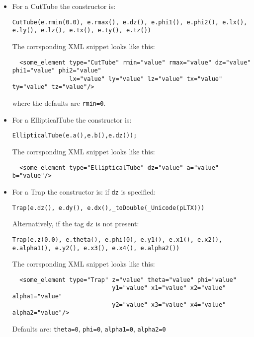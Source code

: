 \begin{itemize}
\item For a CutTube the constructor is:
\begin{verbatim}
CutTube(e.rmin(0.0), e.rmax(), e.dz(), e.phi1(), e.phi2(), e.lx(), e.ly(), e.lz(), e.tx(), e.ty(), e.tz())
\end{verbatim}
The corrsponding XML snippet looks like this:
\begin{verbatim}
  <some_element type="CutTube" rmin="value" rmax="value" dz="value" phi1="value" phi2="value"
                lx="value" ly="value" lz="value" tx="value" ty="value" tz="value"/>
\end{verbatim}
where the defaults are \texttt{rmin=0}.

\item For a EllipticalTube the constructor is:
\begin{verbatim}
EllipticalTube(e.a(),e.b(),e.dz());
\end{verbatim}
The corrsponding XML snippet looks like this:
\begin{verbatim}
  <some_element type="EllipticalTube" dz="value" a="value" b="value"/>
\end{verbatim}

\item For a Trap the constructor is: if \texttt{dz} is specified: 
\begin{verbatim}
Trap(e.dz(), e.dy(), e.dx(),_toDouble(_Unicode(pLTX)))
\end{verbatim}
Alternatively, if the tag  \texttt{dz} is not present: 
\begin{verbatim}
Trap(e.z(0.0), e.theta(), e.phi(0), e.y1(), e.x1(), e.x2(), e.alpha1(), e.y2(), e.x3(), e.x4(), e.alpha2())
\end{verbatim}
The corrsponding XML snippet looks like this:
\begin{verbatim}
  <some_element type="Trap" z="value" theta="value" phi="value"
                            y1="value" x1="value" x2="value" alpha1="value"
                            y2="value" x3="value" x4="value" alpha2="value"/>
\end{verbatim}
Defaults are: \texttt{theta=0},  \texttt{phi=0},  \texttt{alpha1=0},  \texttt{alpha2=0}


\end{itemize}
